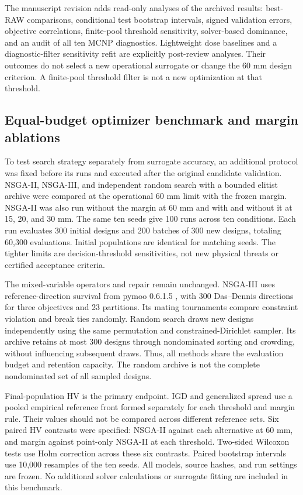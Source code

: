 \documentclass[12pt]{elsarticle}
\begin{document}
The manuscript revision adds read-only analyses of the archived results: best-RAW comparisons, conditional test bootstrap intervals, signed validation errors, objective correlations, finite-pool threshold sensitivity, solver-based dominance, and an audit of all ten MCNP diagnostics. Lightweight dose baselines and a diagnostic-filter sensitivity refit are explicitly post-review analyses. Their outcomes do not select a new operational surrogate or change the 60 mm design criterion. A finite-pool threshold filter is not a new optimization at that threshold.

\subsection{Equal-budget optimizer benchmark and margin ablations}
To test search strategy separately from surrogate accuracy, an additional protocol was fixed before its runs and executed after the original candidate validation. NSGA-II, NSGA-III, and independent random search with a bounded elitist archive were compared at the operational 60 mm limit with the frozen margin. NSGA-II was also run without the margin at 60 mm and with and without it at 15, 20, and 30 mm. The same ten seeds give 100 runs across ten conditions. Each run evaluates 300 initial designs and 200 batches of 300 new designs, totaling 60,300 evaluations. Initial populations are identical for matching seeds. The tighter limits are decision-threshold sensitivities, not new physical threats or certified acceptance criteria.

The mixed-variable operators and repair remain unchanged. NSGA-III uses reference-direction survival from pymoo 0.6.1.5 \cite{Blank2020Pymoo}, with 300 Das--Dennis directions for three objectives and 23 partitions. Its mating tournaments compare constraint violation and break ties randomly. Random search draws new designs independently using the same permutation and constrained-Dirichlet sampler. Its archive retains at most 300 designs through nondominated sorting and crowding, without influencing subsequent draws. Thus, all methods share the evaluation budget and retention capacity. The random archive is not the complete nondominated set of all sampled designs.

Final-population HV is the primary endpoint. IGD and generalized spread use a pooled empirical reference front formed separately for each threshold and margin rule. Their values should not be compared across different reference sets. Six paired HV contrasts were specified: NSGA-II against each alternative at 60 mm, and margin against point-only NSGA-II at each threshold. Two-sided Wilcoxon tests use Holm correction across these six contrasts. Paired bootstrap intervals use 10,000 resamples of the ten seeds. All models, source hashes, and run settings are frozen. No additional solver calculations or surrogate fitting are included in this benchmark.
\end{document}
